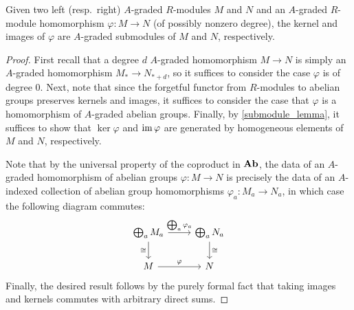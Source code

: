 \documentclass[../main.tex]{subfiles}
\begin{document}
\begin{proposition}\label{image_and_kernel_of_A_graded_map_is_A_graded}
	Given two left (resp.\ right) $A$-graded $R$-modules $M$ and $N$ and an $A$-graded $R$-module homomorphism $\varphi:M\to N$ (of possibly nonzero degree), the kernel and images of $\varphi$ are $A$-graded submodules of $M$ and $N$, respectively.
\end{proposition}
\begin{proof}
	First recall that a degree $d$ $A$-graded homomorphism $M\to N$ is simply an $A$-graded homomorphism $M_*\to N_{*+d}$, so it suffices to consider the case $\varphi$ is of degree $0$. Next, note that since the forgetful functor from $R$-modules to abelian groups preserves kernels and images, it suffices to consider the case that $\varphi$ is a homomorphism of $A$-graded abelian groups. Finally, by \autoref{submodule_lemma}, it suffices to show that $\ker\varphi$ and $\operatorname{im}\varphi$ are generated by homogeneous elements of $M$ and $N$, respectively.

	Note that by the universal property of the coproduct in $\mathbf{Ab}$, the data of an $A$-graded homomorphism of abelian groups $\varphi:M\to N$ is precisely the data of an $A$-indexed collection of abelian group homomorphisms $\varphi_a:M_a\to N_a$, in which case the following diagram commutes:
	\[\begin{tikzcd}
		{\bigoplus_aM_a} & {\bigoplus_aN_a} \\
		M & N
		\arrow["{\bigoplus_a\varphi_a}", from=1-1, to=1-2]
		\arrow["\cong"', from=1-1, to=2-1]
		\arrow["\varphi", from=2-1, to=2-2]
		\arrow["\cong", from=1-2, to=2-2]
	\end{tikzcd}\]
	Finally, the desired result follows by the purely formal fact that taking images and kernels commutes with arbitrary direct sums.
\end{proof}
\end{document}
